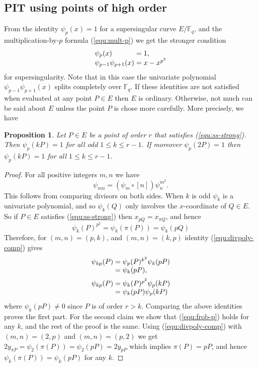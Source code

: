 \documentclass[12pt]{article}
\theoremstyle{plain}
\newtheorem{proposition}[theorem]{Proposition}
\theoremstyle{definition}
\def\F{\ensuremath{\mathbb{F}}}
\begin{document}
\subsection{PIT using points of high order}

From the identity $\psi_p(x) = 1$ for a supersingular curve $E/\F_q$, and the multiplication-by-$p$ 
formula (\ref{equ:mult-p}) we get the stronger condition
\begin{equation}
\label{equ:ss-strong}
	\arraycolsep=1.4pt
	\begin{array}{lll}
		\psi_p(x) & = & 1, \\
		\psi_{p - 1}\psi_{p + 1}(x) & = & x - x^{p^2}
	\end{array}
\end{equation}
for supersingularity. Note that in this case the univariate polynomial $\psi_{p - 1}\psi_{p + 
1}(x)$ splits completely over $\F_q$. If these identities are not satisfied when evaluated at any 
point $P \in E$ then $E$ is ordinary. Otherwise, not much can be said about $E$ unless the point 
$P$ is chose more carefully. More precisely, we have
\begin{proposition}
	Let $P \in E$ be a point of order $r$ that satisfies (\ref{equ:ss-strong}). Then $\psi_p(kP) 
	= 1$ for all odd $1 \le k \le r - 1$. If moreover $\psi_p(2P) = 1$ then $\psi_p(kP) = 1$ for 
	all $1 \le k \le r - 1$.
\end{proposition}
\begin{proof}
	For all positive integers $m, n$ we have
	\begin{equation}
	\label{equ:divpoly-comp}
		\psi_{mn} = (\psi_m \circ [n])\psi_n^{m^2}.
	\end{equation}
	This follows from comparing divisors on both sides. When $k$ is odd $\psi_k$ is a univariate 
	polynomial, and so $\psi_k(Q)$ only involves the $x$-coordinate of $Q \in E$. So if $P \in E$ 
	satisfies (\ref{equ:ss-strong}) then $x_{pQ} = x_{\pi Q}$, and hence 
	\begin{equation}
	\label{equ:frob-p}
		\psi_k(P)^{p^2} = \psi_k(\pi(P)) = \psi_k(pQ)
	\end{equation}
	Therefore, for $(m, n) = (p, k)$, and $(m, n) = (k, p)$ identity (\ref{equ:divpoly-comp}) gives
	\[
	\arraycolsep=1.4pt
	\begin{array}{rll}
		\psi_{kp}(P) & = & \psi_p(P)^{k^2} \psi_k(pP) \\
		& = & \psi_k(pP), \vspace*{2mm} \\		 
		\psi_{kp}(P) & = & \psi_k(P)^{p^2} \psi_p(kP) \\
		& = & \psi_k(pP) \psi_p(kP) \\
	\end{array}
	\]
	where $\psi_k(pP) \ne 0$ since $P$ is of order $r > k$. Comparing the above identities proves 
	the first part. For the second claim we show that (\ref{equ:frob-p}) holds for any $k$, and the 
	rest of the proof is the same. Using (\ref{equ:divpoly-comp}) with $(m, n) = (2, p)$ and $(m, 
	n) = (p, 2)$ we get $2y_{\pi P} = \psi_2(\pi(P)) = \psi_2(pP) = 2y_{pP}$ which implies $\pi(P) 
	= pP$, and hence $\psi_k(\pi(P)) = \psi_k(pP)$ for any $k$.
\end{proof}
\end{document}
